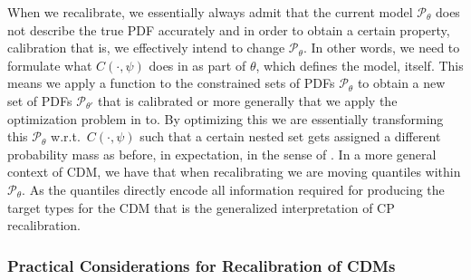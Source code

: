 When we recalibrate, we essentially always admit that the current model $\mathscr{P}_{\theta}$ does not describe the true PDF accurately and in order to obtain a certain property, calibration that is, we effectively intend to change $\mathscr{P}_{\theta}$. In other words, we need to formulate what $C(\cdot, \psi)$ does in  as part of $\theta$, which defines the model, itself. This means we apply a function to the constrained sets of PDFs $\mathscr{P}_{\theta}$ to obtain a new set of PDFs $\mathscr{P}_{\theta'}$ that is calibrated or more generally that we apply the optimization problem in  to. By optimizing this we are essentially transforming this $\mathscr{P}_{\theta}$ w.r.t.\ $C(\cdot, \psi)$ such that a certain nested set gets assigned a different probability mass as before, in expectation, in the sense of . In a more general context of CDM, we have that when recalibrating we are moving quantiles within $\mathscr{P}_\theta$. As the quantiles directly encode all information required for producing the target types for the CDM that is the generalized interpretation of CP recalibration. %

\subsubsection{Practical Considerations for Recalibration of CDMs}

